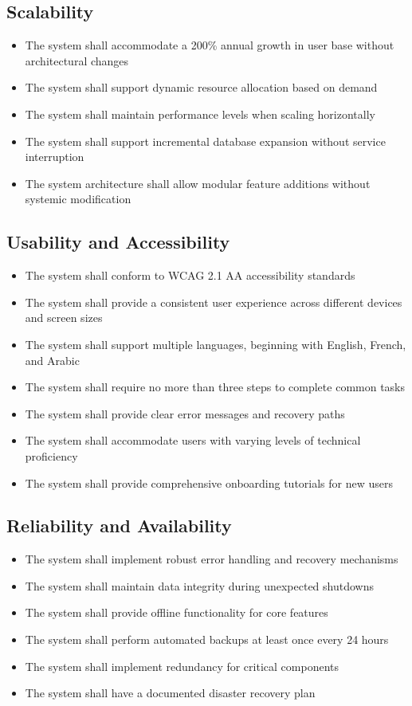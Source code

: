 \subsection{Scalability}
\begin{itemize}
    \item The system shall accommodate a 200\% annual growth in user base without architectural changes
    \item The system shall support dynamic resource allocation based on demand
    \item The system shall maintain performance levels when scaling horizontally
    \item The system shall support incremental database expansion without service interruption
    \item The system architecture shall allow modular feature additions without systemic modification
\end{itemize}

\subsection{Usability and Accessibility}
\begin{itemize}
    \item The system shall conform to WCAG 2.1 AA accessibility standards
    \item The system shall provide a consistent user experience across different devices and screen sizes
    \item The system shall support multiple languages, beginning with English, French, and Arabic
    \item The system shall require no more than three steps to complete common tasks
    \item The system shall provide clear error messages and recovery paths
    \item The system shall accommodate users with varying levels of technical proficiency
    \item The system shall provide comprehensive onboarding tutorials for new users
\end{itemize}

\subsection{Reliability and Availability}
\begin{itemize}
    \item The system shall implement robust error handling and recovery mechanisms
    \item The system shall maintain data integrity during unexpected shutdowns
    \item The system shall provide offline functionality for core features
    \item The system shall perform automated backups at least once every 24 hours
    \item The system shall implement redundancy for critical components
    \item The system shall have a documented disaster recovery plan
\end{itemize}

